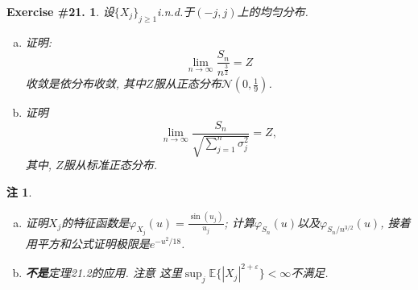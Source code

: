 \documentclass[UTF8, a4paper]{article}
\newtheorem{exercise}{Exercise \#21.}
\newtheorem*{remark}{注}
\begin{document}
\begin{framed}
\begin{exercise}
设\(\{X_j\}_{j\geq 1}\)i.n.d.于\((-j,j)\)上的均匀分布.
\begin{enumerate}[a)]
    \item 证明:$$
\lim _{n \rightarrow \infty} \frac{S_n}{n^{\frac{3}{2}}}=Z
$$
收敛是依分布收敛, 其中\(Z\)服从正态分布\(\mathcal{N}\left(0, \frac{1}{9}\right)\).
\item 证明$$\lim_{n\to\infty}\frac{S_n}{\sqrt{\sum_{j=1}^n\sigma_j^2}}=Z,$$其中, \(Z\)服从标准正态分布.  
\end{enumerate}
\end{exercise}
\end{framed}

\begin{remark}
\begin{enumerate}[a)]
    \item 证明\(X_j\)的特征函数是\(\varphi_{X_j}(u) = \frac{\sin(u_j)}{u_j}\); 计算\(\varphi_{S_n}(u)\)以及\(\varphi_{S_n/n^{3/2}}(u)\), 接着用平方和公式证明极限是\(e^{-u^2/18}\).
    \item {\bf 不是}定理21.2的应用. {\color{red}注意} 这里\(\sup_{j} \mathbb{E}\{|X_j|^{2+ \varepsilon}\} < \infty\)不满足.
\end{enumerate}
\end{remark}
\end{document}
